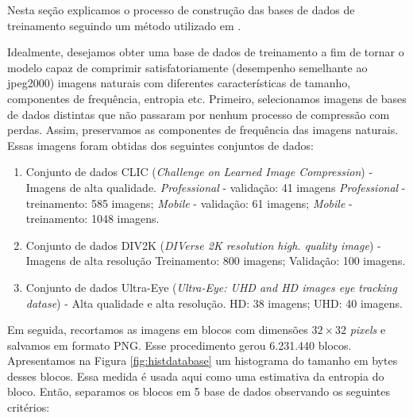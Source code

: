 Nesta seção explicamos o processo de construção das bases de dados de treinamento seguindo um método utilizado em \cite{DeliverableJuly}.


Idealmente, desejamos obter uma base de dados de treinamento a fim de tornar o modelo capaz de comprimir satisfatoriamente (desempenho semelhante ao \acrshort{jpeg}2000) imagens naturais com diferentes características de tamanho, componentes de frequência, entropia etc. Primeiro, selecionamos imagens de bases de dados distintas que não passaram por nenhum processo de compressão com perdas. Assim, preservamos as componentes de frequência das imagens naturais. Essas imagens foram obtidas dos seguintes conjuntos de dados:

\begin{enumerate}
	\item Conjunto de dados CLIC \cite{bib:clic} (\textit{Challenge on Learned Image Compression}) - Imagens de alta qualidade.
	\subitem \textit{Professional} - validação: 41 imagens
	\subitem \textit{Professional} - treinamento: 585 imagens;
	\subitem \textit{Mobile} - validação: 61 imagens;
	\subitem \textit{Mobile} - treinamento: 1048 imagens.
	\item Conjunto de dados DIV2K \cite{bib:div2k} (\textit{DIVerse 2K resolution high.
		quality image}) - Imagens de alta resolução
	\subitem Treinamento: 800 imagens;
	\subitem Validação: 100 imagens.
	\item Conjunto de dados Ultra-Eye \cite{bib:ultraeye} (\textit{Ultra-Eye: UHD and HD images eye tracking datase}) - Alta qualidade e alta resolução.
	\subitem HD: 38 imagens;
	\subitem UHD: 40 imagens.
\end{enumerate}


Em seguida, recortamos as imagens em blocos com dimensões $32 \times 32$ \textit{pixels} e salvamos em formato PNG. Esse procedimento gerou 6.231.440 blocos. Apresentamos na Figura \ref{fig:histdatabase} um histograma do tamanho em bytes desses blocos. Essa medida é usada aqui como uma estimativa da entropia do bloco. Então, separamos os blocos em 5 base de dados observando os seguintes critérios:


